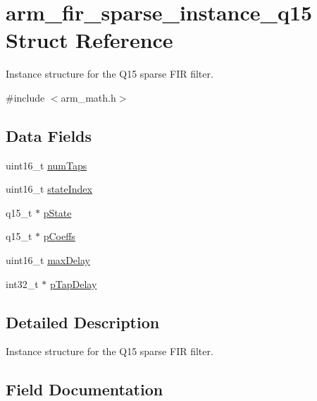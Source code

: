 \hypertarget{structarm__fir__sparse__instance__q15}{}\section{arm\+\_\+fir\+\_\+sparse\+\_\+instance\+\_\+q15 Struct Reference}
\label{structarm__fir__sparse__instance__q15}


Instance structure for the Q15 sparse F\+IR filter.  




{\ttfamily \#include $<$arm\+\_\+math.\+h$>$}

\subsection*{Data Fields}
\begin{DoxyCompactItemize}
\item 
uint16\+\_\+t \hyperlink{structarm__fir__sparse__instance__q15_a751941891e47f522a7f5375fe8990aac}{num\+Taps}
\item 
uint16\+\_\+t \hyperlink{structarm__fir__sparse__instance__q15_a566a0cb53437e48b9a3bf18e5b03d8aa}{state\+Index}
\item 
q15\+\_\+t $\ast$ \hyperlink{structarm__fir__sparse__instance__q15_ae29dfdb736374fcddaeaec4b7770170c}{p\+State}
\item 
q15\+\_\+t $\ast$ \hyperlink{structarm__fir__sparse__instance__q15_a7ca181a37f714d174445f486bebce26f}{p\+Coeffs}
\item 
uint16\+\_\+t \hyperlink{structarm__fir__sparse__instance__q15_ab25f4ee7550e6d92acff77ada283733f}{max\+Delay}
\item 
int32\+\_\+t $\ast$ \hyperlink{structarm__fir__sparse__instance__q15_adec00b3793ab4f08edfeb4ea6a9eb6e6}{p\+Tap\+Delay}
\end{DoxyCompactItemize}


\subsection{Detailed Description}
Instance structure for the Q15 sparse F\+IR filter. 

\subsection{Field Documentation}
\mbox{\label{structarm__fir__sparse__instance__q15_ab25f4ee7550e6d92acff77ada283733f}} 
